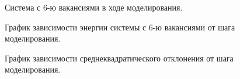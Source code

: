 \documentclass[14pt,a4paper,report]{ncc}
\begin{document}
\begin{figure}[h]
\caption{Система с 6-ю вакансиями в ходе моделирования.}
\label{ris:image12}
\end{figure}
\begin{figure}[h]
\caption{График зависимости энергии системы с 6-ю вакансиями от шага моделирования.}
\label{ris:image13}
\end{figure}
\begin{figure}[h]
\caption{График зависимости среднеквадратического отклонения от шага моделирования.}
\label{ris:image14}
\end{figure}
\end{document}
